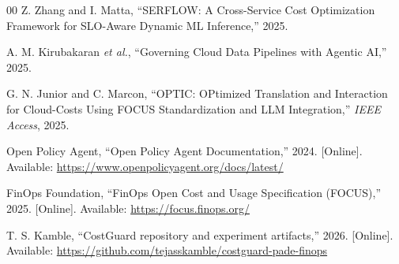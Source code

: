 \documentclass[journal]{IEEEtran}
\begin{document}
\begin{thebibliography}{00}
Z. Zhang and I. Matta, ``SERFLOW: A Cross-Service Cost Optimization Framework for SLO-Aware Dynamic ML Inference,'' 2025.

A. M. Kirubakaran \emph{et al.}, ``Governing Cloud Data Pipelines with Agentic AI,'' 2025.

G. N. Junior and C. Marcon, ``OPTIC: OPtimized Translation and Interaction for Cloud-Costs Using FOCUS Standardization and LLM Integration,'' \emph{IEEE Access}, 2025.

Open Policy Agent, ``Open Policy Agent Documentation,'' 2024. [Online]. Available: \url{https://www.openpolicyagent.org/docs/latest/}

FinOps Foundation, ``FinOps Open Cost and Usage Specification (FOCUS),'' 2025. [Online]. Available: \url{https://focus.finops.org/}

T. S. Kamble, ``CostGuard repository and experiment artifacts,'' 2026. [Online]. Available: \url{https://github.com/tejasskamble/costguard-pade-finops}

\end{thebibliography}
\end{document}
